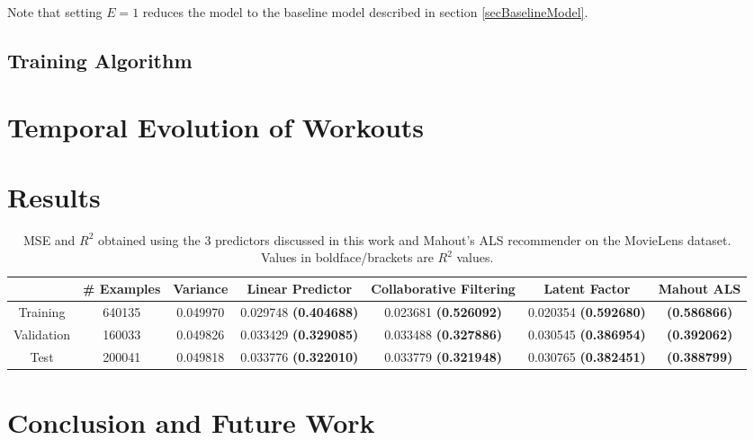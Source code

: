 \documentclass{acm_proc_article-sp}
\begin{document}
Note that setting $E = 1$ reduces the model to the baseline model described in section \ref{secBaselineModel}.

\subsection{Training Algorithm}


\section{Temporal Evolution of Workouts}
\label{secTemporalModelWorkouts}

\section{Results}

\begin{table*}
\centering
\begin{tabular}{|c|c|c|c|c|c|c|} \hline
& \# Examples & Variance & Linear Predictor & Collaborative Filtering & Latent Factor & Mahout ALS \\ \hline
Training & 640135 & 0.049970 & 0.029748 {\bf(0.404688)} & 0.023681 {\bf(0.526092)} & 0.020354 {\bf(0.592680)} & {\bf(0.586866)} \\ \hline
Validation & 160033 & 0.049826 & 0.033429 {\bf(0.329085)}  & 0.033488 {\bf(0.327886)} & 0.030545 {\bf(0.386954)} & {\bf(0.392062)} \\ \hline
Test & 200041 & 0.049818 & 0.033776 {\bf(0.322010)} & 0.033779 {\bf(0.321948)} & 0.030765 {\bf(0.382451)} & {\bf(0.388799)}\\ \hline
\end{tabular}
\caption{MSE and $R^2$ obtained using the 3 predictors discussed in this work and Mahout's ALS recommender on the MovieLens dataset. Values in boldface/brackets are $R^2$ values.}
\label{tableResults}
\end{table*}

\section{Conclusion and Future Work}



\end{document}
